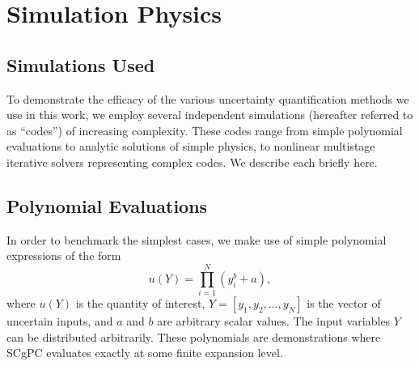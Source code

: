 
\chapter{Simulation Physics} %

\label{ch:models} %



\section{Simulations Used}
To demonstrate the efficacy of the various uncertainty quantification methods we use in this work, we employ
several independent simulations (hereafter referred to as ``codes'') of increasing complexity.  These codes
range from simple polynomial evaluations to analytic solutions of simple physics, to nonlinear multistage
iterative solvers representing complex codes.  We describe each briefly here.

\section{Polynomial Evaluations}
In order to benchmark the simplest cases, we make use of simple polynomial expressions of the form
\begin{equation}
  u(Y) = \prod_{i=1}^N (y^b_i+a),
\end{equation}
where $u(Y)$ is the quantity of interest, $Y=[y_1,y_2,\ldots,y_N]$ is the vector of uncertain inputs, and $a$
and $b$ are arbitrary scalar values.  The input variables $Y$ can be distributed arbitrarily.
These polynomials are demonstrations where SCgPC evaluates exactly at some
finite expansion level.




